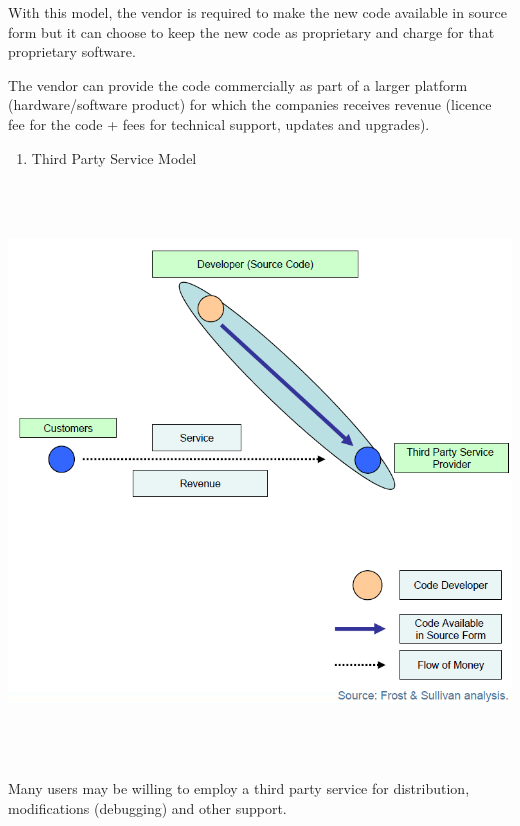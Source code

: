 With this model, the vendor is required to make the new code available
in source form but it can choose to keep the new code as proprietary
and charge for that proprietary software.

The vendor can provide the code commercially as part of a larger
platform (hardware/software product) for which the companies receives
revenue (licence fee for the code + fees for technical support, updates
and upgrades).

\begin{enumerate}
\item Third Party Service Model
\end{enumerate}
 \includegraphics[width=16.595cm,height=15.304cm]{Impact-img2.png}

Many users may be willing to employ a third party service for
distribution, modifications (debugging) and other support.


